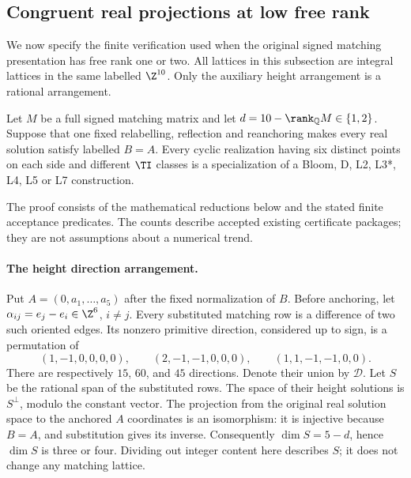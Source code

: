\subsection{Congruent real projections at low free rank}
\label{sec:lr-expanded}

We now specify the finite verification used when the original signed
matching presentation has free rank one or two. All lattices in this
subsection are integral lattices in the same labelled $\Z^{10}$.
Only the auxiliary height arrangement is a rational arrangement.

\begin{lemma}[LR]\label{lem:lr}
Let $M$ be a full signed matching matrix and let
$d=10-\rank_{\mathbb Q}M\in\{1,2\}$. Suppose that one fixed relabelling,
reflection and reanchoring makes every real solution satisfy labelled
$B=A$. Every cyclic realization having six distinct points on each side
and different $\TI$ classes is a specialization of a Bloom, D, L2,
L3*, L4, L5 or L7 construction.
\end{lemma}

The proof consists of the mathematical reductions below and the stated
finite acceptance predicates. The counts describe accepted existing
certificate packages; they are not assumptions about a numerical trend.

\paragraph{The height direction arrangement.}
Put $A=(0,a_1,\ldots,a_5)$ after the fixed normalization of $B$.
Before anchoring, let $\alpha_{ij}=e_j-e_i\in\Z^6$, $i\ne j$.
Every substituted matching row is a difference of two such oriented
edges. Its nonzero primitive direction, considered up to sign, is a
permutation of
\[
 (1,-1,0,0,0,0),\qquad (2,-1,-1,0,0,0),\qquad
 (1,1,-1,-1,0,0).
\]
There are respectively $15$, $60$, and $45$ directions. Denote their
union by $\mathcal D$. Let $S$ be the rational span of the substituted
rows. The space of their height solutions is $S^\perp$, modulo the
constant vector. The projection from the original real solution space
to the anchored $A$ coordinates is an isomorphism: it is injective
because $B=A$, and substitution gives its inverse. Consequently
$\dim S=5-d$, hence $\dim S$ is three or four. Dividing out integer
content here describes $S$; it does not change any matching lattice.

